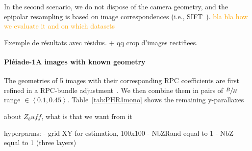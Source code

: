 \documentclass{ipol}
\newcommand{\er}[1]{\textcolor{orange}{#1}}
\begin{document}
In the second scenario, we do not dispose of the camera geometry, and the epipolar resampling is based on image correspondences (i.e., SIFT~\cite{lowe2004distinctive}). \er{ bla bla how we evaluate it and on which datasets}
 

Exemple de résultats avec résidus. + qq crop d'images rectifiees.

\paragraph{Pl\'eiade-1A images with known geometry}
% 
The geometries of 5 images with their corresponding RPC coefficients are first refined in a RPC-bundle adjustment~\cite{rupnika2016refined}. We then combine them in pairs of $\sfrac{B}{H}$ range $\in \left< 0.1,0.45 \right> $. Table~\ref{tab:PHR1mono} shows the remaining y-parallaxes 


about $Z_buff$, what is that we want from it

hyperparms:
- grid XY for estimation, 100x100
- NbZRand equal to 1
- NbZ equal to 1 (three layers)
 
\end{document}
